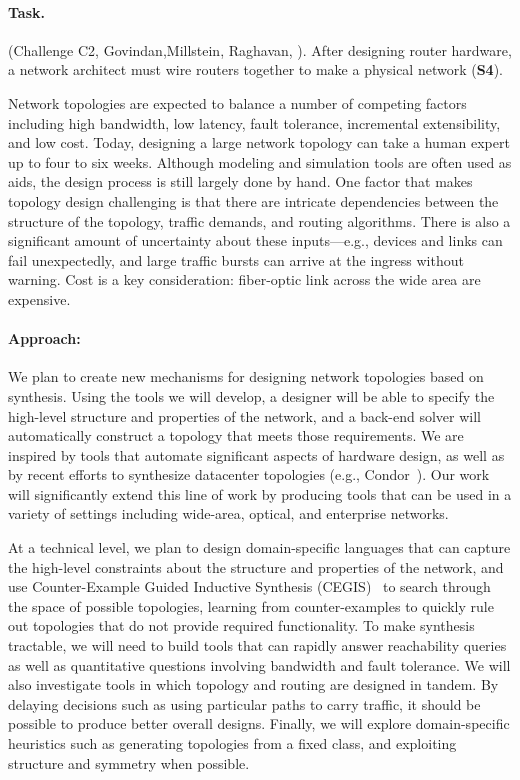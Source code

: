 \paragraph*{Task.} (Challenge C2,  Govindan,Millstein, Raghavan, ). After designing
router hardware, a network architect must wire routers together to
make a physical network ({\bf S4}).
%

Network topologies are expected to balance a number of competing
factors including high bandwidth, low latency, fault tolerance,
incremental extensibility, and low cost. Today, designing a large
network topology can take a human expert up to four to six
weeks. Although modeling and simulation tools are often used as aids,
the design process is still largely done by hand. One factor that
makes topology design challenging is that there are intricate
dependencies between the structure of the topology, traffic demands,
and routing algorithms. There is also a significant amount of
uncertainty about these inputs---e.g., devices and links can fail
unexpectedly, and large traffic bursts can arrive at the ingress
without warning. Cost is a key consideration: fiber-optic link across
the wide area are expensive. 

\paragraph*{Approach:}
%
We plan to create new mechanisms for designing network topologies
based on synthesis. Using the tools we will develop, a designer will
be able to specify the high-level structure and properties of the
network, and a back-end solver will automatically construct a topology
that meets those requirements. We are inspired by tools that automate
significant aspects of hardware design, as well as by recent efforts
to synthesize datacenter topologies (e.g., Condor~\cite{condor}). Our
work will significantly extend this line of work by producing tools
that can be used in a variety of settings including wide-area,
optical, and enterprise networks.

At a technical level, we plan to design domain-specific languages that
can capture the high-level constraints about the structure and
properties of the network, and use Counter-Example Guided Inductive
Synthesis (CEGIS)~\cite{sketch} to search through the space of possible topologies,
learning from counter-examples to quickly rule out topologies that do
not provide required functionality. To make synthesis tractable, we
will need to build tools that can rapidly answer reachability queries
as well as quantitative questions involving bandwidth and fault
tolerance. We will also investigate tools in which topology and
routing are designed in tandem. By delaying decisions such as using
particular paths to carry traffic, it should be possible to produce
better overall designs. Finally, we will explore domain-specific
heuristics such as generating topologies from a fixed class, and
exploiting structure and symmetry when possible.

